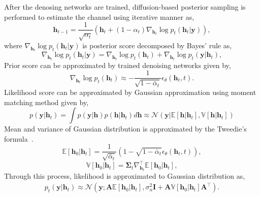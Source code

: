 \documentclass[lettersize,journal]{IEEEtran}
\begin{document}
After the denosing networks are trained, diffusion-based posterior sampling is performed to estimate the channel using iterative manner as,
\begin{equation}
\mathbf{h}_{t-1} = \frac{1}{\sqrt{ \alpha_{t} }}(\mathbf{h}_{t}+(1-\alpha_{t})\nabla_{\mathbf{h}_{t}}\log p_{t}(\mathbf{h}_{t}|\mathbf{y})),
\end{equation}
where $\nabla_{\mathbf{h}_{t}}\log p_{t}(\mathbf{h}_{t}|\mathbf{y})$ is posterior score decomposed by Bayes' rule as,
\begin{equation}
\nabla_{\mathbf{h}_{t}}\log p_{t}(\mathbf{h}_{t}|\mathbf{y}) = \nabla_{\mathbf{h}_{t}}\log p_{t}(\mathbf{h}_{t})+\nabla_{\mathbf{h}_{t}}\log p_{t}(\mathbf{y}|\mathbf{h}_{t}),
\end{equation}
Prior score can be approximated by trained denoising networks given by,
\begin{equation}
\nabla_{\mathbf{h}_{t}}\log p_{t}(\mathbf{h}_{t})\approx -\frac{1}{\sqrt{ 1-\bar{\alpha}_{t} }}\epsilon_{\theta}(\mathbf{h}_{t},t).
\end{equation}
Likelihood score can be approximated by Gaussian approximation using moment matching method given by,
\begin{equation}
p(\mathbf{y}|\mathbf{h}_{t}) = \int p(\mathbf{y}|\mathbf{h})p(\mathbf{h}|\mathbf{h}_{t})d\mathbf{h} \approx\mathcal{N}(\mathbf{y}|\mathbb{E}[\mathbf{h}|\mathbf{h}_{t}], \mathbb{V}[\mathbf{h}|\mathbf{h}_{t}])
\end{equation}
Mean and variance of Gaussian distribution is approximated by the Tweedie’s formula~\cite{efronTweediesFormulaSelection2011}.
\begin{equation}
\mathbb{E}[\mathbf{h}_{0}|\mathbf{h}_{t}] = \frac{1}{\sqrt{ \bar{\alpha}_{t} }}(1-\sqrt{ 1-\bar{\alpha}_{t} }\epsilon_{\theta}(\mathbf{h}_{t},t)),
\end{equation}
\begin{equation}
\mathbb{V}[\mathbf{h}_{0}|\mathbf{h}_{t}] = \boldsymbol{\Sigma}_{t}\nabla_{\mathbf{h}_{t}}^{\top}\mathbb{E}[\mathbf{h}_{0}|\mathbf{h}_{t}],
\end{equation}
Through this process, likelihood is approximated to Gaussian distribution as,
\begin{equation}
\begin{aligned}
p_{t}(\mathbf{y}|\mathbf{h}_{t}) \approx \mathcal{N}(\mathbf{y}; \mathbf{A}\mathbb{E}[\mathbf{h}_{0}|\mathbf{h}_{t}], \sigma_{n}^{2}\mathbf{I}+\mathbf{A}\mathbb{V}[\mathbf{h}_{0}|\mathbf{h}_{t}]\mathbf{A}^{\top}).
\end{aligned}
\end{equation}
\end{document}
